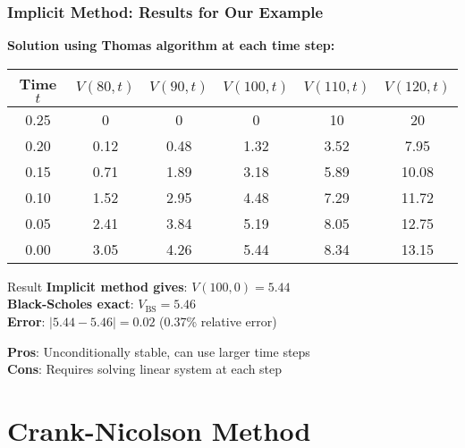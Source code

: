 \documentclass[aspectratio=169]{beamer}
\begin{document}
\begin{frame}
\frametitle{Implicit Method: Results for Our Example}
\textbf{Solution using Thomas algorithm at each time step:}

\begin{center}
\begin{tabular}{c|c|c|c|c|c}
Time \(t\) & \(V(80,t)\) & \(V(90,t)\) & \(V(100,t)\) & \(V(110,t)\) & \(V(120,t)\) \\
\hline
0.25 & 0 & 0 & 0 & 10 & 20 \\
0.20 & 0.12 & 0.48 & 1.32 & 3.52 & 7.95 \\
0.15 & 0.71 & 1.89 & 3.18 & 5.89 & 10.08 \\
0.10 & 1.52 & 2.95 & 4.48 & 7.29 & 11.72 \\
0.05 & 2.41 & 3.84 & 5.19 & 8.05 & 12.75 \\
0.00 & 3.05 & 4.26 & 5.44 & 8.34 & 13.15 \\
\end{tabular}
\end{center}

\begin{block}{Result}
\textbf{Implicit method gives}: \(V(100, 0) = 5.44\)\\
\textbf{Black-Scholes exact}: \(V_{\text{BS}} = 5.46\)\\
\textbf{Error}: \(|5.44 - 5.46| = 0.02\) (0.37\% relative error)
\end{block}

\textbf{Pros}: Unconditionally stable, can use larger time steps\\
\textbf{Cons}: Requires solving linear system at each step
\end{frame}

\section{Crank-Nicolson Method}
\end{document}
